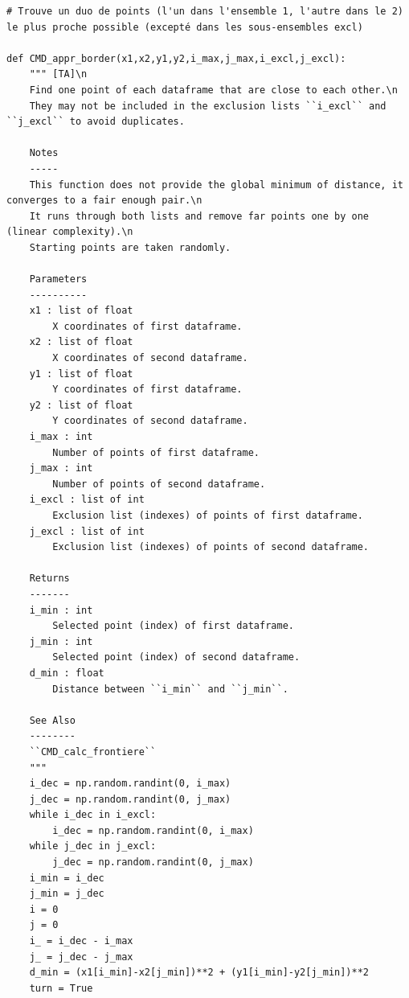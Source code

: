 \documentclass[12pt]{article}
\begin{document}
\begin{lstlisting}
# Trouve un duo de points (l'un dans l'ensemble 1, l'autre dans le 2) le plus proche possible (excepté dans les sous-ensembles excl)

def CMD_appr_border(x1,x2,y1,y2,i_max,j_max,i_excl,j_excl):
    """ [TA]\n
    Find one point of each dataframe that are close to each other.\n
    They may not be included in the exclusion lists ``i_excl`` and ``j_excl`` to avoid duplicates.
    
    Notes
    -----
    This function does not provide the global minimum of distance, it converges to a fair enough pair.\n
    It runs through both lists and remove far points one by one (linear complexity).\n
    Starting points are taken randomly.
    
    Parameters
    ----------
    x1 : list of float
        X coordinates of first dataframe.
    x2 : list of float
        X coordinates of second dataframe.
    y1 : list of float
        Y coordinates of first dataframe.
    y2 : list of float
        Y coordinates of second dataframe.
    i_max : int
        Number of points of first dataframe.
    j_max : int
        Number of points of second dataframe.
    i_excl : list of int
        Exclusion list (indexes) of points of first dataframe.
    j_excl : list of int
        Exclusion list (indexes) of points of second dataframe.
    
    Returns
    -------
    i_min : int
        Selected point (index) of first dataframe.
    j_min : int
        Selected point (index) of second dataframe.
    d_min : float
        Distance between ``i_min`` and ``j_min``.
    
    See Also
    --------
    ``CMD_calc_frontiere``
    """
    i_dec = np.random.randint(0, i_max)
    j_dec = np.random.randint(0, j_max)
    while i_dec in i_excl:
        i_dec = np.random.randint(0, i_max)
    while j_dec in j_excl:
        j_dec = np.random.randint(0, j_max)
    i_min = i_dec
    j_min = j_dec
    i = 0
    j = 0
    i_ = i_dec - i_max
    j_ = j_dec - j_max
    d_min = (x1[i_min]-x2[j_min])**2 + (y1[i_min]-y2[j_min])**2
    turn = True
    

\end{lstlisting}
\end{document}

